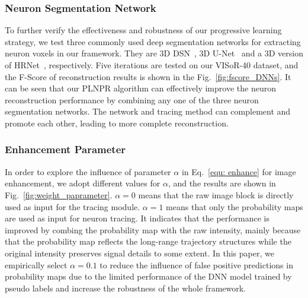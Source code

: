 \subsubsection{Neuron Segmentation Network}

To further verify the effectiveness and robustness of our progressive learning strategy, we test three commonly used deep segmentation networks for extracting neuron voxels in our framework. They are 3D DSN~\cite{Dou2017}, 3D U-Net~\cite{Cicek2016} and a 3D version of HRNet~\cite{Sun2019}, respectively.
Five iterations are tested on our VISoR-40 dataset, and the F-Score of reconstruction results is shown in the Fig.~\ref{fig:fscore_DNNs}. 
It can be seen that our PLNPR algorithm can effectively improve the neuron reconstruction performance by combining any one of the three neuron segmentation networks.
The network and tracing method can complement and promote each other, leading to more complete reconstruction.


\subsubsection{Enhancement Parameter} 

In order to explore the influence of parameter $\alpha$ in Eq.~\eqref{equ: enhance} for image enhancement, we adopt different values for $\alpha$, and the results are shown in Fig.~\ref{fig:weight_paprameter}.
$\alpha=0$ means that the raw image block is directly used as input for the tracing module.
$\alpha=1$ means that only the probability maps are used as input for neuron tracing. 
It indicates that the performance is improved by combing the probability map with the raw intensity, mainly because that the probability map reflects the long-range trajectory structures while the original intensity preserves signal details to some extent.
In this paper, we empirically select $\alpha=0.1$ to reduce the influence of false positive predictions in probability maps due to the limited performance of the DNN model trained by pseudo labels and increase the robustness of the whole framework.



